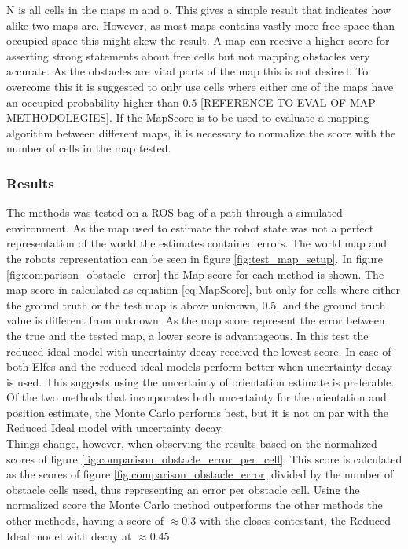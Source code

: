N is all cells in the maps m and o. 
This gives a simple result that indicates how alike two maps are. 
However, as most maps contains vastly more free space than occupied space this might skew the result. 
A map can receive a higher score for asserting strong statements about free cells but not mapping obstacles very accurate. 
As the obstacles are vital parts of the map this is not desired. 
To overcome this it is suggested to only use cells where either one of the maps have an occupied probability higher than \(0.5\) [REFERENCE TO EVAL OF MAP METHODOLEGIES]. 
If the MapScore is to be used to evaluate a mapping algorithm between different maps, it is necessary to normalize the score with the number of cells in the map tested. 
 
\subsubsection{Results}
The methods was tested on a ROS-bag of a path through a simulated environment. 
As the map used to estimate the robot state was not a perfect representation of the world the estimates contained errors. 
The world map and the robots representation can be seen in figure \ref{fig:test_map_setup}.
In figure \ref{fig:comparison_obstacle_error} the Map score for each method is shown. The map score in calculated as equation \ref{eq:MapScore}, but only for cells where either the ground truth or the test map is above unknown, 0.5, and the ground truth value is different from unknown. As the map score represent the error between the true and the tested map, a lower score is advantageous. In this test the reduced ideal model with uncertainty decay received the lowest score. In case of both Elfes and the reduced ideal models perform better when uncertainty decay is used. This suggests using the uncertainty of orientation estimate is preferable. Of the two methods that incorporates both uncertainty for the orientation and position estimate, the Monte Carlo performs best, but it is not on par with the Reduced Ideal model with uncertainty decay.\\

 
Things change, however, when observing the results based on the normalized scores of figure \ref{fig:comparison_obstacle_error_per_cell}. This score is calculated as the scores of figure \ref{fig:comparison_obstacle_error} divided by the number of obstacle cells used, thus representing an error per obstacle cell.
Using the normalized score the Monte Carlo method outperforms the other methods the other methods, having a score of \(\approx 0.3\) with the closes contestant, the Reduced Ideal model with decay at \(\approx 0.45\).\\


